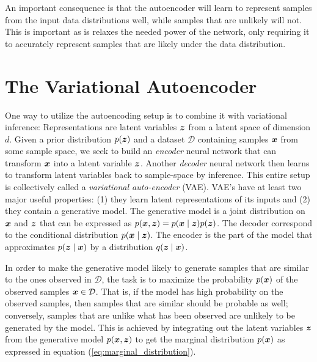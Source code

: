 An important consequence is that the autoencoder will learn to represent samples from the input data distributions well, while samples that are unlikely will not. This is important as is relaxes the needed power of the network, only requiring it to accurately represent samples that are likely under the data distribution.
\section{The Variational Autoencoder}

One way to utilize the autoencoding setup is to combine it with variational inference: Representations are latent variables $\bm{ z }$ from a latent space of dimension $d$. Given a prior distribution $p{\mathopen{} \left( \bm{ z } \right) \mathclose{}}$ and a dataset $\mathcal{D}$ containing samples $\bm{ x }$ from some sample space, we seek to build an \textit{encoder} neural network that can transform $\bm{ x }$ into a latent variable $\bm{ z }$. Another \textit{decoder} neural network then learns to transform latent variables back to sample-space by inference. This entire setup is collectively called a \textit{variational auto-encoder} (VAE).
VAE's have at least two major useful properties: (1) they learn latent representations of its inputs and (2) they contain a generative model. The generative model is a joint distribution on $\bm{ x }$ and $\bm{ z }$ that can be expressed as $p(\bm{ x }, \bm{ z }) = p(\bm{ x } \mid \bm{ z }) p(\bm{ z })$. The decoder correspond to the conditional distribution $p(\bm{ x } \mid \bm{ z })$. The encoder is the part of the model that approximates $p(\bm{ z } \mid \bm{ x })$ by a distribution $q(\bm{ z } \mid \bm{ x })$. 

In order to make the generative model likely to generate samples that are similar to the ones observed in $\mathcal{D}$, the task is to maximize the probability $p(\bm{ x })$ of the observed samples $\bm{ x } \in \mathcal{D}$. That is, if the model has high probability on the observed samples, then samples that are similar should be probable as well; conversely, samples that are unlike what has been observed are unlikely to be generated by the model. This is achieved by integrating out the latent variables $\bm{ z }$ from the generative model $p(\bm{ x }, \bm{ z })$ to get the marginal distribution $p(\bm{ x })$ as expressed in equation (\ref{eq:marginal_distribution}).


